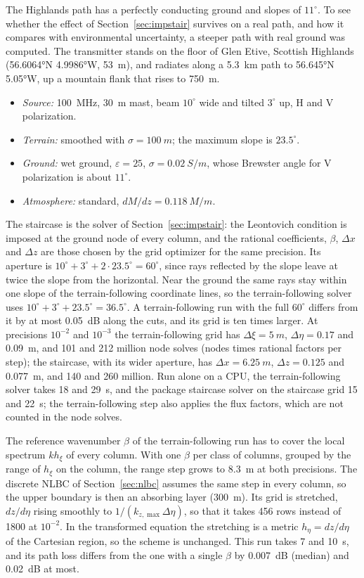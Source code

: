 \documentclass[journal]{IEEEtran}
\begin{document}
The Highlands path has a perfectly conducting ground and slopes of $11^\circ$. To
see whether the effect of Section~\ref{sec:impstair} survives on a real path,
and how it compares with environmental uncertainty, a steeper path with real
ground was computed. The transmitter stands on the floor of Glen Etive,
Scottish Highlands (\ang{56.6064}N \ang{4.9986}W, \SI{53}{m}), and radiates
along a \SI{5.3}{km} path to \ang{56.645}N \ang{5.05}W, up a mountain flank
that rises to \SI{750}{m}.
\begin{itemize}
\item \emph{Source:} \SI{100}{MHz}, \SI{30}{m} mast, beam $10^\circ$ wide and
tilted $3^\circ$ up, H and V polarization.
\item \emph{Terrain:} smoothed with $\sigma=\SI{100}{m}$; the maximum slope is
$23.5^\circ$.
\item \emph{Ground:} wet ground, $\varepsilon=25$, $\sigma=\SI{0.02}{S/m}$,
whose Brewster angle for V polarization is about $11^\circ$.
\item \emph{Atmosphere:} standard, $dM/dz=\SI{0.118}{M/m}$.
\end{itemize}
The staircase is the solver of Section~\ref{sec:impstair}: the Leontovich
condition is imposed at the ground node of every column, and the rational
coefficients, $\beta$, $\Delta x$ and $\Delta z$ are those chosen by the grid
optimizer for the same precision. Its aperture is $10^\circ+3^\circ+2\cdot23.5^\circ=60^\circ$,
since rays reflected by the slope leave at twice the slope from the horizontal.
Near the ground the same rays stay within one slope of the terrain-following
coordinate lines, so the terrain-following solver uses
$10^\circ+3^\circ+23.5^\circ=36.5^\circ$. A terrain-following run with the full
$60^\circ$ differs from it by at most \SI{0.05}{dB} along the cuts, and its
grid is ten times larger. At precisions $10^{-2}$ and $10^{-3}$ the
terrain-following grid has $\Delta\xi=\SI{5}{m}$, $\Delta\eta=0.17$ and
\SI{0.09}{m}, and 101 and 212 million node solves (nodes times rational
factors per step); the staircase, with its wider aperture, has
$\Delta x=\SI{6.25}{m}$, $\Delta z=0.125$ and \SI{0.077}{m}, and 140 and 260
million. Run alone on a CPU, the terrain-following solver takes 18 and
\SI{29}{s}, and the package staircase solver on the staircase grid 15 and
\SI{22}{s}; the terrain-following step also applies the flux factors, which
are not counted in the node solves.

The reference wavenumber $\beta$ of the terrain-following run has to cover the
local spectrum $kh_\xi$ of every column. With one $\beta$ per class of columns,
grouped by the range of $h_\xi$ on the column, the range step grows to
\SI{8.3}{m} at both precisions. The discrete NLBC of
Section~\ref{sec:nlbc} assumes the same step in every column, so the upper
boundary is then an absorbing layer (\SI{300}{m}). Its grid is stretched,
$dz/d\eta$ rising smoothly to $1/(k_{z,\max}\Delta\eta)$, so that it
takes 456 rows instead of 1800 at $10^{-2}$. In the transformed equation the stretching is
a metric $h_\eta=dz/d\eta$ of the Cartesian region, so the scheme is unchanged.
This run takes 7 and \SI{10}{s}, and its path loss differs from the one with a
single $\beta$ by \SI{0.007}{dB} (median) and \SI{0.02}{dB} at most.
\end{document}
